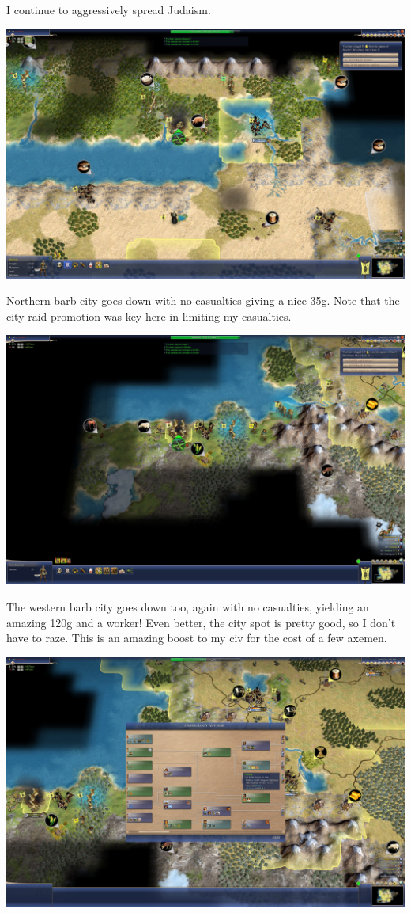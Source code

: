 \documentclass[10pt]{article}
\begin{document}
I continue to aggressively spread Judaism.

\includegraphics[width=1.0\textwidth]{97}

Northern barb city goes down with no casualties giving a nice 35g. Note that the city raid promotion was key here
in limiting my casualties.

\includegraphics[width=1.0\textwidth]{99}

The western barb city goes down too, again with no casualties, yielding an amazing 120g and a worker! Even better, the
city spot is pretty good, so I don't have to raze. This is an amazing boost to my civ for the cost of a few axemen.

\includegraphics[width=1.0\textwidth]{100}
\end{document}
